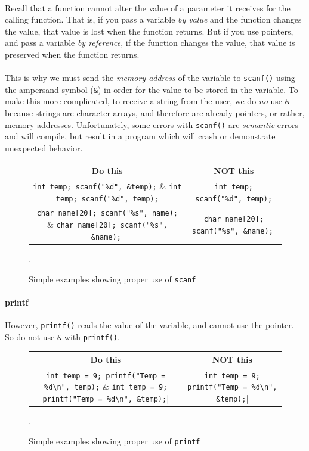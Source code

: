 \documentclass[letter,11pt]{article}
\begin{document}
\paragraph{}Recall that a function cannot alter the value of a parameter it receives for the calling function. That is, if you pass a variable \textit{by value} and the function changes the value, that value is lost when the function returns. But if you use pointers, and pass a variable \textit{by reference}, if the function changes the value, that value is preserved when the function returns.

\paragraph{}This is why we must send the \textit{memory address} of the variable to \texttt{scanf()} using the ampersand symbol (\texttt{\&}) in order for the value to be stored in the variable. To make this more complicated, to receive a string from the user, we do \textit{no} use \texttt{\&} because strings are character arrays, and therefore are already pointers, or rather, memory addresses. Unfortunately, some errors with \texttt{scanf()} are \textit{semantic} errors and will compile, but result in a program which will crash or demonstrate unexpected behavior.

\begin{figure}[h!]
    \centering
    \begin{tabular}{c|c}
        Do this & NOT this \\ \hline
        \verb|int temp; scanf("%d", &temp);| & \verb|int temp; scanf("%d", temp);| \\
        \verb|char name[20]; scanf("%s", name);| & \verb|char name[20]; scanf("%s", &name);|
    \end{tabular}
    \caption{Simple examples showing proper use of \texttt{scanf}}.
    \label{fig:scanfdodont}
\end{figure}

\paragraph{printf}However, \texttt{printf()} reads the value of the variable, and cannot use the pointer. So do not use \texttt{\&} with \texttt{printf()}.

\begin{figure}[h!]
    \centering
    \begin{tabular}{c|c}
        Do this & NOT this \\ \hline
        \verb|int temp = 9; printf("Temp = %d\n", temp);| & \verb|int temp = 9; printf("Temp = %d\n", &temp);|
    \end{tabular}
    \caption{Simple examples showing proper use of \texttt{printf}}.
    \label{fig:scanfdodont2}
\end{figure}
\end{document}
